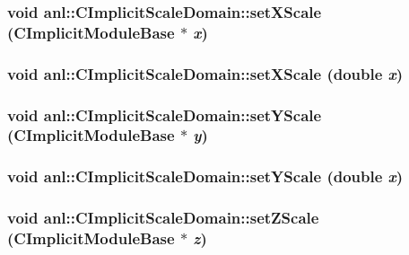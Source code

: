 \label{classanl_1_1CImplicitScaleDomain_ae5210707bac75f3c1efdf49c1e758be9}
\hypertarget{classanl_1_1CImplicitScaleDomain_a9b9f220cb9dfda7ccda23b40e506d0d6}{
\subsubsection[{setXScale}]{\setlength{\rightskip}{0pt plus 5cm}void anl::CImplicitScaleDomain::setXScale ({\bf CImplicitModuleBase} $\ast$ {\em x})}}
\label{classanl_1_1CImplicitScaleDomain_a9b9f220cb9dfda7ccda23b40e506d0d6}
\hypertarget{classanl_1_1CImplicitScaleDomain_ad009671387e9386b3e79614e9fea2a1a}{
\subsubsection[{setXScale}]{\setlength{\rightskip}{0pt plus 5cm}void anl::CImplicitScaleDomain::setXScale (double {\em x})}}
\label{classanl_1_1CImplicitScaleDomain_ad009671387e9386b3e79614e9fea2a1a}
\hypertarget{classanl_1_1CImplicitScaleDomain_af50b869f0dd05e63fca5643d068c2230}{
\subsubsection[{setYScale}]{\setlength{\rightskip}{0pt plus 5cm}void anl::CImplicitScaleDomain::setYScale ({\bf CImplicitModuleBase} $\ast$ {\em y})}}
\label{classanl_1_1CImplicitScaleDomain_af50b869f0dd05e63fca5643d068c2230}
\hypertarget{classanl_1_1CImplicitScaleDomain_a6322ef1b6d26e656fcf0808a4ff07197}{
\subsubsection[{setYScale}]{\setlength{\rightskip}{0pt plus 5cm}void anl::CImplicitScaleDomain::setYScale (double {\em x})}}
\label{classanl_1_1CImplicitScaleDomain_a6322ef1b6d26e656fcf0808a4ff07197}
\hypertarget{classanl_1_1CImplicitScaleDomain_a8ab377fd0f03119a9bbd9d399d0721d7}{
\subsubsection[{setZScale}]{\setlength{\rightskip}{0pt plus 5cm}void anl::CImplicitScaleDomain::setZScale ({\bf CImplicitModuleBase} $\ast$ {\em z})}}
